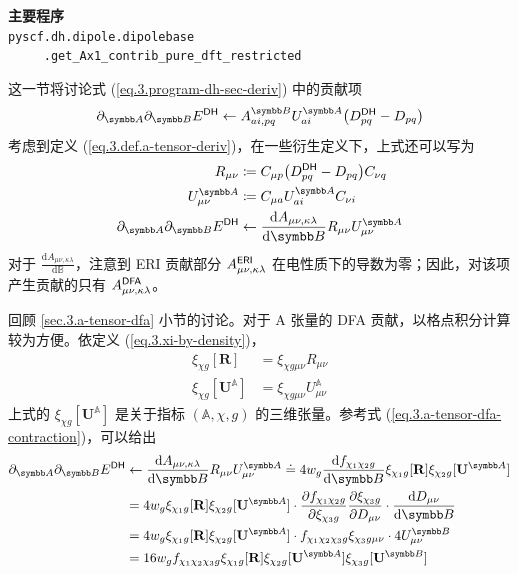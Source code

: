 \begin{tcolorbox}
    \textbf{主要程序}\\
    \verb|pyscf.dh.dipole.dipolebase|\\
    \verb|     .get_Ax1_contrib_pure_dft_restricted|
\end{tcolorbox}

这一节将讨论式 (\ref{eq.3.program-dh-sec-deriv}) 中的贡献项
\begin{equation}
    \partial_\mathbb{A} \partial_\mathbb{B} E^\textmt{DH} \leftarrow A_{ai, pq}^\mathbb{B} U_{ai}^\mathbb{A} \big( D_{pq}^\textmt{DH} - D_{pq} \big)
\end{equation}
考虑到定义 (\ref{eq.3.def.a-tensor-deriv})，在一些衍生定义下，上式还可以写为
\begin{align}
    R_{\mu \nu} &\coloneq C_{\mu p} \big( D_{pq}^\textmt{DH} - D_{pq} \big) C_{\nu q} \notag \\
    U_{\mu \nu}^\mathbb{A} &\coloneq C_{\mu a} U_{ai}^\mathbb{A} C_{\nu i} \notag\\
    \partial_\mathbb{A} \partial_\mathbb{B} E^\textmt{DH} &\leftarrow \frac{\mathrm{d} A_{\mu \nu, \kappa \lambda}}{\mathrm{d} \mathbb{B}} R_{\mu \nu} U_{\mu \nu}^\mathbb{A} \notag
\end{align}
对于 $\frac{\mathrm{d} A_{\mu \nu, \kappa \lambda}}{\mathrm{d} \mathbb{B}}$，注意到 ERI 贡献部分 $A_{\mu \nu, \kappa \lambda}^{\textsf{ERI}}$ 在电性质下的导数为零；因此，对该项产生贡献的只有 $A_{\mu \nu, \kappa \lambda}^{\textsf{DFA}}$。

回顾 \ref{sec.3.a-tensor-dfa} 小节的讨论。对于 A 张量的 DFA 贡献，以格点积分计算较为方便。依定义 (\ref{eq.3.xi-by-density})，
\begin{align*}
    \xi_{\chi g} [\mathbf{R}] &= \xi_{\chi g \mu \nu} R_{\mu \nu} \\
    \xi_{\chi g} [\mathbf{U}^\mathbb{A}] &= \xi_{\chi g \mu \nu} U_{\mu \nu}^\mathbb{A}
\end{align*}
上式的 $\xi_{\chi g} [\mathbf{U}^\mathbb{A}]$ 是关于指标 $(\mathbb{A}, \chi, g)$ 的三维张量。参考式 (\ref{eq.3.a-tensor-dfa-contraction})，可以给出
\begin{align}
    \partial_\mathbb{A} \partial_\mathbb{B} E^\textmt{DH} &\leftarrow \frac{\mathrm{d} A_{\mu \nu, \kappa \lambda}}{\mathrm{d} \mathbb{B}} R_{\mu \nu} U_{\mu \nu}^\mathbb{A}
    \doteq 4 w_g \frac{\mathrm{d} f_{\chi_1 \chi_2 g}}{\mathrm{d} \mathbb{B}} \xi_{\chi_1 g} [\mathbf{R}] \xi_{\chi_2 g} [\mathbf{U}^\mathbb{A}] \notag\\
    &= 4 w_g \xi_{\chi_1 g} [\mathbf{R}] \xi_{\chi_2 g} [\mathbf{U}^\mathbb{A}] \cdot \frac{\partial f_{\chi_1 \chi_2 g}}{\partial \xi_{\chi_3 g}} \frac{\partial \xi_{\chi_3 g}}{\partial D_{\mu \nu}} \cdot \frac{\mathrm{d} D_{\mu \nu}}{\mathrm{d} \mathbb{B}} \notag\\
    &= 4 w_g \xi_{\chi_1 g} [\mathbf{R}] \xi_{\chi_2 g} [\mathbf{U}^\mathbb{A}] \cdot f_{\chi_1 \chi_2 \chi_3 g} \xi_{\chi_3 g \mu \nu} \cdot 4 U_{\mu \nu}^\mathbb{B} \notag\\
    &= 16 w_g f_{\chi_1 \chi_2 \chi_3 g} \xi_{\chi_1 g} [\mathbf{R}] \xi_{\chi_2 g} [\mathbf{U}^\mathbb{A}] \xi_{\chi_3 g} [\mathbf{U}^\mathbb{B}]
\end{align}

